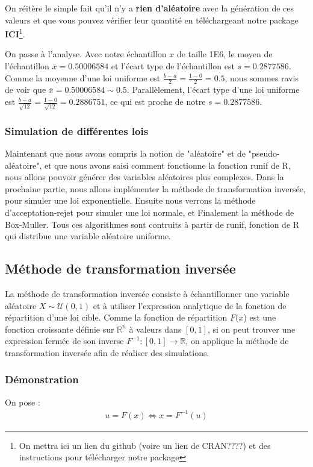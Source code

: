 \documentclass[10pt]{article} %
\begin{document}
On réitère le simple fait qu'il n'y a \textbf{rien d'aléatoire} avec la génération de ces valeurs et que vous pouvez vérifier leur quantité en
téléchargeant notre package \textbf{ICI}\footnote{On mettra ici un lien du github (voire un lien de CRAN????) et des instructions pour télécharger notre package}.

On passe à l'analyse. Avec notre échantillon $x$ de taille 1E6, le moyen de l'échantillon $\bar x = 0.50006584$ et l'écart type de l'échantillon est $s = 0.2877586$.
Comme la moyenne d'une loi uniforme est $\frac{b - a}{2} = \frac{1 - 0}{2} = 0.5$, nous sommes ravis de voir que $\bar x = 0.50006584 \sim 0.5$. Parallèlement, l'écart type
d'une loi uniforme est $\frac{b - a}{\sqrt{12}} = \frac{1 - 0}{\sqrt{12}} = 0.2886751$, ce qui est proche de notre $s = 0.2877586$.


\subsubsection{Simulation de différentes lois}

Maintenant que nous avons compris la notion de "aléatoire" et de "pseudo-aléatoire", et que nous avons saisi comment fonctionne la fonction runif de R, nous allons pouvoir générer des variables aléatoires plus complexes. Dans la prochaine partie, nous allons implémenter la méthode de transformation inversée, pour simuler une loi exponentielle. Ensuite nous verrons la méthode d'acceptation-rejet pour simuler une loi normale, et Finalement la méthode de Box-Muller. Tous ces  algorithmes sont contruits à partir de runif, fonction de R qui distribue une variable aléatoire uniforme.

\subsection{Méthode de transformation inversée}

La méthode de transformation inversée consiste à échantillonner une variable aléatoire $X \sim \mathcal{U}(0, 1)$ et à utiliser l'expression analytique
de la fonction de répartition d'une loi cible. Comme la fonction de répartition $F(x$) est une fonction croissante définie sur $\mathbb{R}^n$ à valeurs dans
$[0, 1]$, si on peut trouver une expression fermée de son inverse $F^{-1} : [0, 1] \longrightarrow \mathbb{R}$, on applique la méthode de transformation inversée
afin de réaliser des simulations.

\subsubsection{Démonstration}
On pose :
\begin{align}
u = F(x) \Leftrightarrow x = F^{-1}(u)
\end{align}
\end{document}
